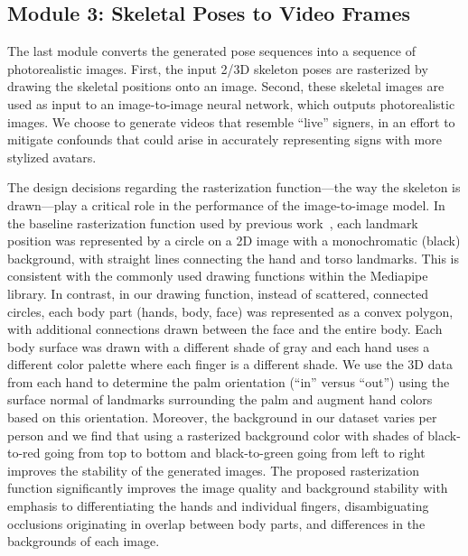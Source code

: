 \subsection{Module 3: Skeletal Poses to Video Frames}\label{subsec:module3}
The last module converts the generated pose sequences into a sequence of photorealistic images. 
First, the input 2/3D skeleton poses are rasterized by drawing the skeletal positions onto an image. 
Second, these skeletal images are used as input to an image-to-image neural network, which outputs photorealistic images. We choose to generate videos that resemble ``live'' signers, in an effort to mitigate confounds that could arise in accurately representing signs with more stylized avatars.

The design decisions regarding the rasterization function---the way the skeleton is drawn---play a critical role in the performance of the image-to-image model. In the baseline rasterization function used by previous work~\cite{zhang2023adding, hu2024animate}, each landmark position was represented by a circle on a 2D image with a monochromatic (black) background, with straight lines connecting the hand and torso landmarks. This is consistent with the commonly used drawing functions within the Mediapipe~\cite{lugaresi2019mediapipe} library. In contrast, in our drawing function, instead of scattered, connected circles, each body part (\ie hands, body, face) was represented as a convex polygon, with additional connections drawn between the face and the entire body. Each body surface was drawn with a different shade of gray and each hand uses a different color palette where each finger is a different shade. We use the 3D data from each hand to determine the palm orientation (``in'' versus ``out'') using the surface normal of landmarks surrounding the palm and augment hand colors based on this orientation. Moreover, the background in our dataset varies per person and we find that using a rasterized background color with shades of black-to-red going from top to bottom and black-to-green going from left to right improves the stability of the generated images. The proposed rasterization function significantly improves the image quality and background stability with emphasis to differentiating the hands and individual fingers, disambiguating occlusions originating in overlap between body parts, and differences in the backgrounds of each image.

